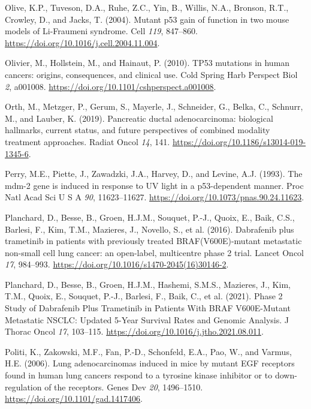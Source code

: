 \begin{CSLReferences}{0}{0}
\leavevmode{}%
Olive, K.P., Tuveson, D.A., Ruhe, Z.C., Yin, B., Willis, N.A., Bronson, R.T., Crowley, D., and Jacks, T. (2004). Mutant p53 gain of function in two mouse models of Li-Fraumeni syndrome. Cell \emph{119}, 847--860. \url{https://doi.org/10.1016/j.cell.2004.11.004}.

\leavevmode{}%
Olivier, M., Hollstein, M., and Hainaut, P. (2010). TP53 mutations in human cancers: origins, consequences, and clinical use. Cold Spring Harb Perspect Biol \emph{2}, a001008. \url{https://doi.org/10.1101/cshperspect.a001008}.

\leavevmode{}%
Orth, M., Metzger, P., Gerum, S., Mayerle, J., Schneider, G., Belka, C., Schnurr, M., and Lauber, K. (2019). Pancreatic ductal adenocarcinoma: biological hallmarks, current status, and future perspectives of combined modality treatment approaches. Radiat Oncol \emph{14}, 141. \url{https://doi.org/10.1186/s13014-019-1345-6}.

\leavevmode{}%
Perry, M.E., Piette, J., Zawadzki, J.A., Harvey, D., and Levine, A.J. (1993). The mdm-2 gene is induced in response to UV light in a p53-dependent manner. Proc Natl Acad Sci U S A \emph{90}, 11623--11627. \url{https://doi.org/10.1073/pnas.90.24.11623}.

\leavevmode{}%
Planchard, D., Besse, B., Groen, H.J.M., Souquet, P.-J., Quoix, E., Baik, C.S., Barlesi, F., Kim, T.M., Mazieres, J., Novello, S., et al. (2016). Dabrafenib plus trametinib in patients with previously treated BRAF(V600E)-mutant metastatic non-small cell lung cancer: an open-label, multicentre phase 2 trial. Lancet Oncol \emph{17}, 984--993. \url{https://doi.org/10.1016/s1470-2045(16)30146-2}.

\leavevmode{}%
Planchard, D., Besse, B., Groen, H.J.M., Hashemi, S.M.S., Mazieres, J., Kim, T.M., Quoix, E., Souquet, P.-J., Barlesi, F., Baik, C., et al. (2021). Phase 2 Study of Dabrafenib Plus Trametinib in Patients With BRAF V600E-Mutant Metastatic NSCLC: Updated 5-Year Survival Rates and Genomic Analysis. J Thorac Oncol \emph{17}, 103--115. \url{https://doi.org/10.1016/j.jtho.2021.08.011}.

\leavevmode{}%
Politi, K., Zakowski, M.F., Fan, P.-D., Schonfeld, E.A., Pao, W., and Varmus, H.E. (2006). Lung adenocarcinomas induced in mice by mutant EGF receptors found in human lung cancers respond to a tyrosine kinase inhibitor or to down-regulation of the receptors. Genes Dev \emph{20}, 1496--1510. \url{https://doi.org/10.1101/gad.1417406}.


\end{CSLReferences}
